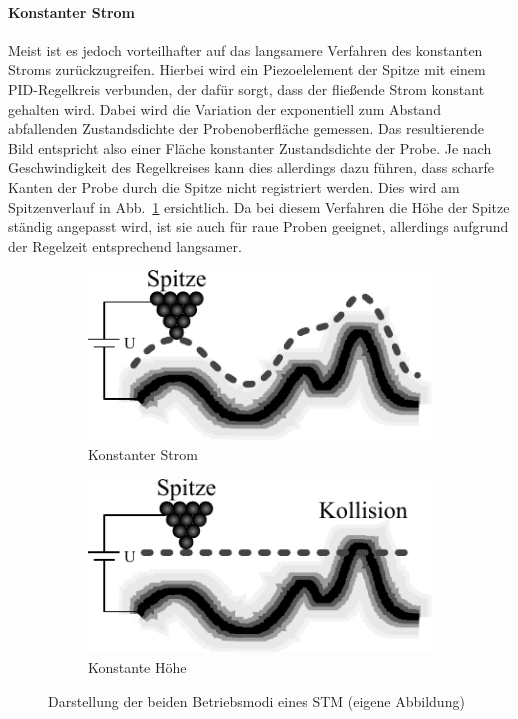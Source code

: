 \documentclass[a4paper,twoside,final]{article}
\begin{document}
\paragraph{Konstanter Strom} Meist ist es jedoch vorteilhafter auf das langsamere Verfahren des konstanten Stroms zurückzugreifen. Hierbei wird ein Piezoelelement der Spitze mit einem PID-Regelkreis verbunden, der dafür sorgt, dass der fließende Strom konstant gehalten wird. Dabei wird die Variation der exponentiell zum Abstand abfallenden Zustandsdichte der Probenoberfläche gemessen. Das resultierende Bild entspricht also einer Fläche konstanter Zustandsdichte der Probe. Je nach Geschwindigkeit des Regelkreises kann dies allerdings dazu führen, dass scharfe Kanten der Probe durch die Spitze nicht registriert werden. Dies wird am Spitzenverlauf in Abb.~\ref{fig:Betriebsmodi} ersichtlich. Da bei diesem Verfahren die Höhe der Spitze ständig angepasst wird, ist sie auch für raue Proben geeignet, allerdings aufgrund der Regelzeit entsprechend langsamer.
\begin{figure}[htp]
    \centering
    \vspace{-2mm}
    \begin{subfigure}{0.45\textwidth}
        \includegraphics{Bilder/STM_konstStrom.pdf}
        \caption{Konstanter Strom}
    \end{subfigure}
    \hspace{1cm}
    \begin{subfigure}{0.45\textwidth}
        \includegraphics{Bilder/STM_konstHoehe.pdf}
        \caption{Konstante Höhe}
    \end{subfigure}
    \caption{Darstellung der beiden Betriebsmodi eines STM (eigene Abbildung)}
    \label{fig:Betriebsmodi}
\end{figure}
\end{document}
